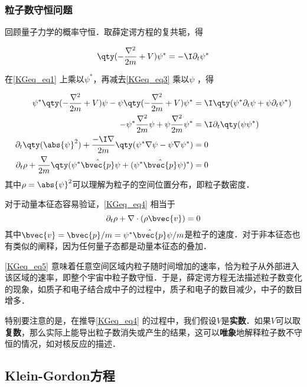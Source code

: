 \subsubsection{粒子数守恒问题}

回顾量子力学的概率守恒．取薛定谔方程的复共轭，得

\begin{equation}\label{KGeq_eq3}
\qty(-\frac{\nabla^2}{2m}+V)\psi^* = -\I \partial_t \psi^*
\end{equation}

在\autoref{KGeq_eq1} 上乘以$\psi^*$，再减去\autoref{KGeq_eq3} 乘以$\psi$ ，得

\begin{equation}\label{KGeq_eq4}
\begin{aligned}
\psi^*\qty(-\frac{\nabla^2}{2m}+V)\psi - \psi\qty(-\frac{\nabla^2}{2m}+V)\psi^* &= \I\qty(\psi^*\partial_t\psi + \psi\partial_t\psi^*)\\
-\psi^*\frac{\nabla^2}{2m}\psi + \psi\frac{\nabla^2}{2m}\psi^* &= \I \partial_t\qty(\psi\psi^*)\\
\partial_t\qty(\abs{\psi}^2) + \frac{-\I\nabla}{2m}\qty(\psi^*\nabla\psi-\psi\nabla\psi^*) &= 0\\
\partial_t \rho + \frac{\nabla}{2m} \qty(\psi^*\hat{\bvec{p}}\psi + (\psi^*\hat{\bvec{p}}\psi)^*) &= 0
\end{aligned}
\end{equation}
其中$\rho=\abs{\psi}^2$可以理解为粒子的空间位置分布，即粒子数密度．

对于动量本征态容易验证，\autoref{KGeq_eq4} 相当于
\begin{equation}\label{KGeq_eq5}
\partial_t\rho + \nabla\cdot(\rho \bvec{v}) = 0
\end{equation}
其中$\bvec{v}=\bvec{p}/m=\psi^*\hat{\bvec{p}}\psi/m$是粒子的速度．对于非本征态也有类似的阐释，因为任何量子态都是动量本征态的叠加．

\autoref{KGeq_eq5} 意味着任意空间区域内粒子随时间增加的速率，恰为粒子从外部进入该区域的速率，即整个宇宙中粒子数守恒．于是，薛定谔方程无法描述粒子数变化的现象，如质子和电子结合成中子的过程中，质子和电子的数目减少，中子的数目增多．

特别要注意的是，在推导\autoref{KGeq_eq4} 的过程中，我们假设$V$是\textbf{实数}．如果$V$可以取\textbf{复数}，那么实际上能导出粒子数消失或产生的结果，这可以\textbf{唯象}地解释粒子数不守恒的情况，如对核反应的描述．



\subsection{Klein-Gordon方程}

